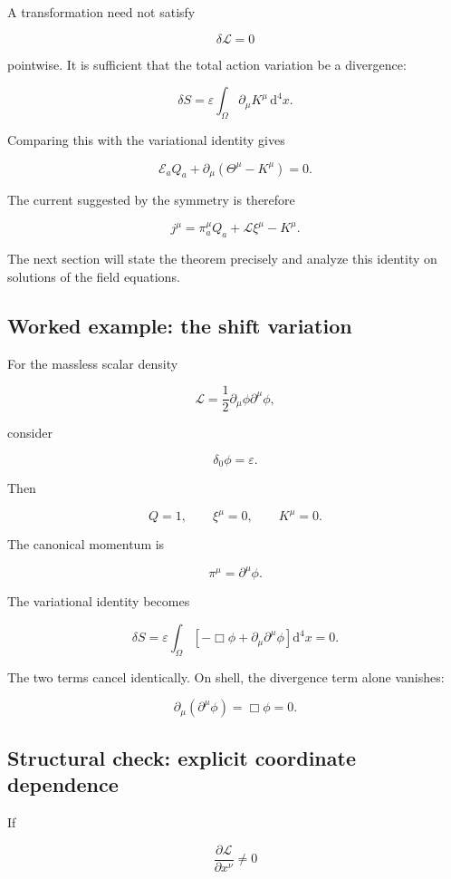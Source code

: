 A transformation need not satisfy

\[
\delta\mathcal{L}=0
\]

pointwise. It is sufficient that the total action variation be a divergence:

\[
\boxed{
\delta S
=
\varepsilon
\int_{\Omega}
\partial_{\mu}K^{\mu}
\,\mathrm{d}^{4}x
}.
\]

Comparing this with the variational identity gives

\[
\mathcal{E}_aQ_a
+
\partial_{\mu}
\left(
\Theta^{\mu}-K^{\mu}
\right)
=
0.
\]

The current suggested by the symmetry is therefore

\[
\boxed{
j^{\mu}
=
\pi_a^{\mu}Q_a
+
\mathcal{L}\xi^{\mu}
-
K^{\mu}
}.
\]

The next section will state the theorem precisely and analyze this identity on solutions of the field equations.

\subsection{Worked example: the shift variation}

For the massless scalar density

\[
\mathcal{L}
=
\frac{1}{2}
\partial_{\mu}\phi
\partial^{\mu}\phi,
\]

consider

\[
\delta_0\phi
=
\varepsilon.
\]

Then

\[
Q=1,
\qquad
\xi^{\mu}=0,
\qquad
K^{\mu}=0.
\]

The canonical momentum is

\[
\pi^{\mu}
=
\partial^{\mu}\phi.
\]

The variational identity becomes

\[
\delta S
=
\varepsilon
\int_{\Omega}
\left[
-\Box\phi
+
\partial_{\mu}\partial^{\mu}\phi
\right]
\mathrm{d}^{4}x
=
0.
\]

The two terms cancel identically. On shell, the divergence term alone vanishes:

\[
\partial_{\mu}
\left(
\partial^{\mu}\phi
\right)
=
\Box\phi
=
0.
\]

\subsection{Structural check: explicit coordinate dependence}

If

\[
\frac{\partial\mathcal{L}}
{\partial x^{\nu}}
\neq 0
\]

